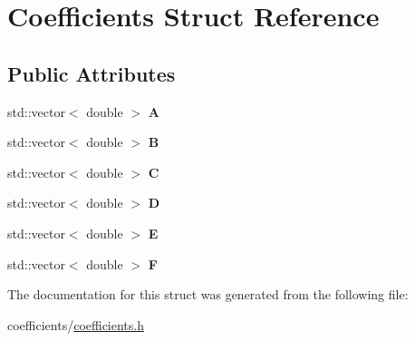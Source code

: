 \hypertarget{struct_coefficients}{}\section{Coefficients Struct Reference}
\label{struct_coefficients}
\subsection*{Public Attributes}
\begin{DoxyCompactItemize}
\item 
\mbox{\label{struct_coefficients_a393c4df20dd36581381a01781a5caeab}} 
std\+::vector$<$ double $>$ {\bfseries A}
\item 
\mbox{\label{struct_coefficients_a9773d7164d6ade936ad653d39c09d2f4}} 
std\+::vector$<$ double $>$ {\bfseries B}
\item 
\mbox{\label{struct_coefficients_aeed704dade86a58a24826759933fd7b3}} 
std\+::vector$<$ double $>$ {\bfseries C}
\item 
\mbox{\label{struct_coefficients_a889b049e7eaf56d7d9db091083d84246}} 
std\+::vector$<$ double $>$ {\bfseries D}
\item 
\mbox{\label{struct_coefficients_af5d7a608eed3a1a8e67ec25be82062ba}} 
std\+::vector$<$ double $>$ {\bfseries E}
\item 
\mbox{\label{struct_coefficients_ab5b55c034557b413fbb9ce9d692bf719}} 
std\+::vector$<$ double $>$ {\bfseries F}
\end{DoxyCompactItemize}


The documentation for this struct was generated from the following file\+:\begin{DoxyCompactItemize}
\item 
coefficients/\mbox{\hyperlink{coefficients_8h}{coefficients.\+h}}\end{DoxyCompactItemize}

